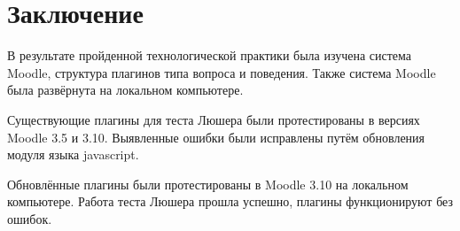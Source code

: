 \chapter*{Заключение} \label{ch-conclusion}

В результате пройденной технологической практики была изучена система Moodle, структура плагинов типа вопроса и поведения. Также система Moodle была развёрнута на локальном компьютере.

Существующие плагины для теста Люшера были протестированы в версиях Moodle 3.5 и 3.10. Выявленные ошибки были исправлены путём обновления модуля языка javascript.

Обновлённые плагины были протестированы в Moodle 3.10 на локальном компьютере. Работа теста Люшера прошла успешно, плагины функционируют без ошибок.
